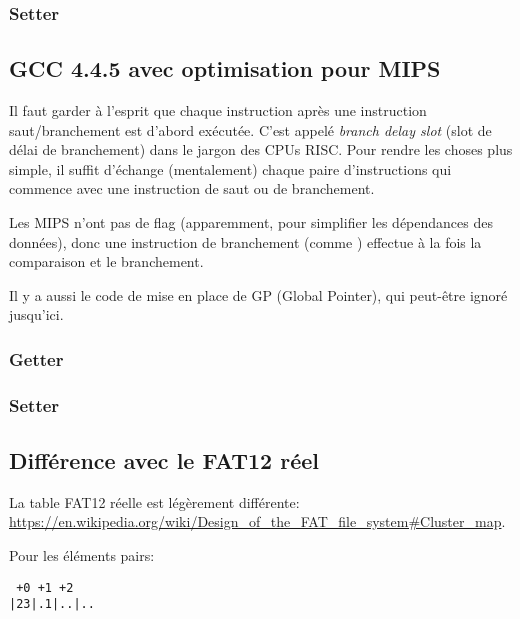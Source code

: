 \subsubsection{Setter}



\subsection{GCC 4.4.5 avec optimisation pour MIPS}

Il faut garder à l'esprit que chaque instruction après une instruction
saut/branchement est d'abord exécutée.
C'est appelé \emph{branch delay slot} (slot de délai de branchement) dans le jargon
des CPUs RISC.
Pour rendre les choses plus simple, il suffit d'échange (mentalement) chaque paire
d'instructions qui commence avec une instruction de saut ou de branchement.

Les MIPS n'ont pas de flag (apparemment, pour simplifier les dépendances des données),
donc une instruction de branchement (comme ) effectue à la fois la comparaison
et le branchement.

Il y a aussi le code de mise en place de GP (Global Pointer), qui peut-être ignoré
jusqu'ici.

\subsubsection{Getter}



\subsubsection{Setter}



\subsection{Différence avec le FAT12 réel}

La table FAT12 réelle est légèrement différente: \url{https://en.wikipedia.org/wiki/Design_of_the_FAT_file_system\#Cluster_map}.

Pour les éléments pairs:

\begin{lstlisting}
 +0 +1 +2
|23|.1|..|..
\end{lstlisting}

